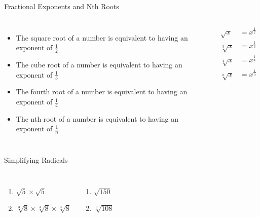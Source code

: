 \documentclass[aspectratio=169]{beamer}
\begin{document}
\begin{frame}{Fractional Exponents and Nth Roots}
\begin{tcolorbox}[colback=lightgray,colframe=primary,title=Key Concepts]
\footnotesize
\begin{columns}
\begin{itemize}
  \item The square root of a number is equivalent to having an exponent of $\frac{1}{2}$
  \item The cube root of a number is equivalent to having an exponent of $\frac{1}{3}$
  \item The fourth root of a number is equivalent to having an exponent of $\frac{1}{4}$
  \item The nth root of a number is equivalent to having an exponent of $\frac{1}{n}$
\end{itemize}
\begin{align*}
\sqrt{x} &= x^{\frac{1}{2}} \\
\sqrt[3]{x} &= x^{\frac{1}{3}} \\
\sqrt[4]{x} &= x^{\frac{1}{4}} \\
\sqrt[n]{x} &= x^{\frac{1}{n}}
\end{align*}
\end{columns}
\end{tcolorbox}
\end{frame}

\begin{frame}{Simplifying Radicals}
\begin{tcolorbox}[colback=lightgray,colframe=accent,title=Practice Problems]
\footnotesize
\begin{columns}[T]
\begin{enumerate}
  \item $\sqrt{5} \times \sqrt{5}$
  \item $\sqrt[3]{8} \times \sqrt[3]{8} \times \sqrt[3]{8}$
\end{enumerate}
\begin{enumerate}
  \item $\sqrt{150}$
  \item $\sqrt[3]{108}$
\end{enumerate}
\end{columns}
\end{tcolorbox}
\end{frame}
\end{document}
